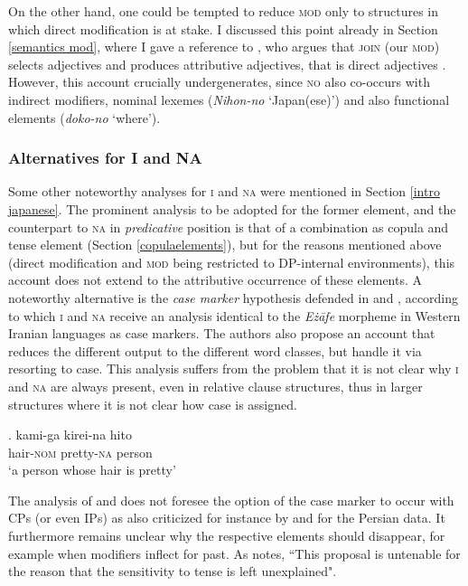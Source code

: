On the other hand, one could be tempted to reduce \textsc{mod} only to structures in which direct modification is at stake. I discussed this point already in Section \ref{semantics mod}, where I gave a reference to \citet{belk:2017:attributes}, who argues that \textsc{join} (our \textsc{mod}) selects adjectives and produces attributive adjectives, that is direct adjectives \citep[§ 2.3]{belk:2017:attributes}. However, this account crucially undergenerates, since \textsc{no} also co-occurs with indirect modifiers, nominal lexemes (\textit{Nihon-no} `Japan(ese)’) and also functional elements (\textit{doko-no} `where’).

\subsubsection{Alternatives for I and NA}

Some other noteworthy analyses for \textsc{i} and \textsc{na} were mentioned in Section \ref{intro japanese}. The prominent analysis to be adopted for the former element, and the counterpart to \textsc{na} in \textit{predicative} position is that of a combination as copula and tense element (Section \ref{copulaelements}), but for the reasons mentioned above (direct modification and \textsc{mod} being restricted to DP-internal environments), this account does not extend to the attributive occurrence of these elements. A noteworthy alternative is the \textit{case marker} hypothesis defended in \citet{yamakido:2005:nature} and \citet{larson:2008:ezafe}, according to which \textsc{i} and \textsc{na} receive an analysis identical to the \textit{E{\.z}āfe} morpheme in Western Iranian languages as case markers. The authors also propose an account that reduces the different output to the different word classes, but handle it via resorting to case. This analysis suffers from the problem that it is not clear why \textsc{i} and \textsc{na} are always present, even in relative clause structures, thus in larger structures where it is not clear how case is assigned.

\exg. kami-ga kirei-na hito\\
hair-\textsc{nom} pretty-\textsc{na} person\\
`a person whose hair is pretty' \null \hfill \citep[34]{kaplan:1995:the}

The analysis of \citet{yamakido:2005:nature} and \citet{larson:2008:ezafe} does not foresee the option of the case marker to occur with CPs (or even IPs) as also criticized for instance by \citet{samvelian:2008:ezafe} and \citet{kahne:2014:revisiting} for the  Persian data. It furthermore remains unclear why the respective elements should disappear, for example when modifiers inflect for past. As \citet[296, Footnote 25]{watanabe:2013:non} notes, ``This proposal is untenable for the reason that the sensitivity to tense is left unexplained".

